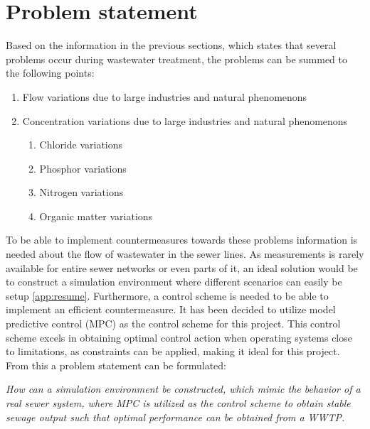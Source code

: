 \newpage
\section{Problem statement}\label{sec:problem_statement}

Based on the information in the previous sections, which states that several problems occur during wastewater treatment, the problems can be summed to the following points:

\begin{enumerate}
\item Flow variations due to large industries and natural phenomenons
\item Concentration variations due to large industries and natural phenomenons
\begin{enumerate}
	\item Chloride variations
	\item Phosphor variations
	\item Nitrogen variations
	\item Organic matter variations
\end{enumerate}
\end{enumerate}

To be able to implement countermeasures towards these problems information is needed about the flow of wastewater in the sewer lines. As measurements is rarely available for entire sewer networks or even parts of it, an ideal solution would be to construct a simulation environment where different scenarios can easily be setup \ref{app:resume}. Furthermore, a control scheme is needed to be able to implement an efficient countermeasure. It has been decided to utilize model predictive control (MPC) as the control scheme for this project. This control scheme excels in obtaining optimal control action when operating systems close to limitations, as constraints can be applied, making it ideal for this project.
From this a problem statement can be formulated: \\
\begin{center}
\textit{How can a simulation environment be constructed, which mimic the behavior of a real sewer system, where MPC is utilized as the control scheme to obtain stable sewage output such that optimal performance can be obtained from a WWTP.}
\end{center}